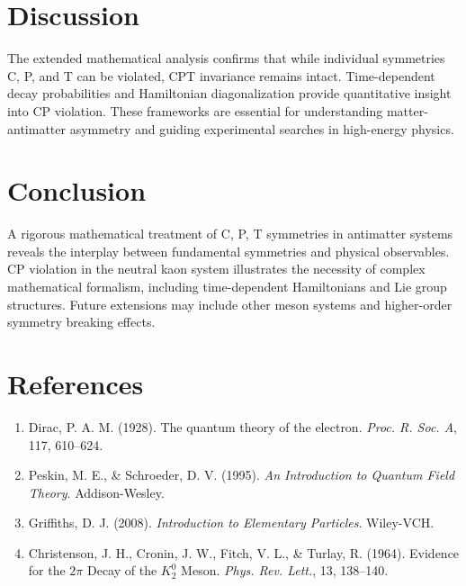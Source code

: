 \documentclass[12pt,a4paper]{article}
\begin{document}
\section{Discussion}
The extended mathematical analysis confirms that while individual symmetries C, P, and T can be violated, CPT invariance remains intact. Time-dependent decay probabilities and Hamiltonian diagonalization provide quantitative insight into CP violation. These frameworks are essential for understanding matter-antimatter asymmetry and guiding experimental searches in high-energy physics.

\section{Conclusion}
A rigorous mathematical treatment of C, P, T symmetries in antimatter systems reveals the interplay between fundamental symmetries and physical observables. CP violation in the neutral kaon system illustrates the necessity of complex mathematical formalism, including time-dependent Hamiltonians and Lie group structures. Future extensions may include other meson systems and higher-order symmetry breaking effects.

\section{References}
\begin{enumerate}
    \item Dirac, P. A. M. (1928). The quantum theory of the electron. \textit{Proc. R. Soc. A}, 117, 610–624.
    \item Peskin, M. E., \& Schroeder, D. V. (1995). \textit{An Introduction to Quantum Field Theory}. Addison-Wesley.
    \item Griffiths, D. J. (2008). \textit{Introduction to Elementary Particles}. Wiley-VCH.
    \item Christenson, J. H., Cronin, J. W., Fitch, V. L., \& Turlay, R. (1964). Evidence for the $2\pi$ Decay of the $K_2^0$ Meson. \textit{Phys. Rev. Lett.}, 13, 138–140.
\end{enumerate}
\end{document}
